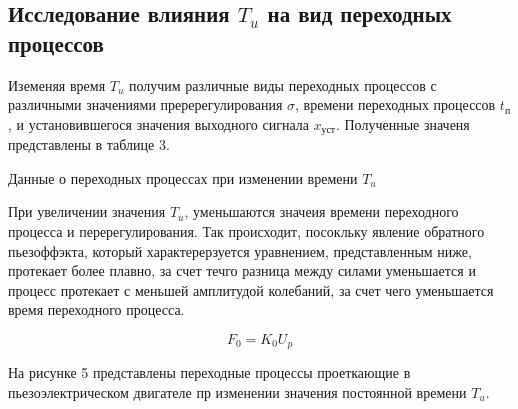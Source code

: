 \documentclass[a4paper, 12pt]{article}
\begin{document}
\newpage
\begin{center}
	

\section{ Исследование влияния $T_u$ на вид переходных процессов}
\end{center}
Иземеняя время $T_u$ получим различные виды переходных процессов с различными значениями преререгулирования $\sigma$, времени переходных процессов $t_\text{п}$, и установившегося значения выходного сигнала $x_\text{уст}$. Полученные значеня представлены в таблице 3.
\begin{table}[h!]
    \centering
    \begin{threeparttable}
        \caption{Данные о переходных процессах при изменении времени $T_u$}
    \end{threeparttable}
\end{table} \par
При увеличении значения $T_u$, уменьшаются значеия времени переходного процесса и перерегулирования. Так происходит, посокльку явление обратного пьезоффэкта, который характерерзуется уравнением, представленным ниже, протекает более плавно, за счет течго разница между силами уменьшается и процесс протекает с меньшей амплитудой колебаний, за счет чего уменьшается время переходного процесса. \par
\begin{equation*}
    F_0 = K_0U_p
\end{equation*} \par
На рисунке 5 представлены переходные процессы проеткающие в пьезоэлектрическом двигателе пр изменении значения постоянной времени $T_u$.
\end{document}
